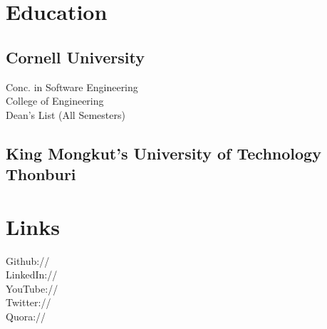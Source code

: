 \documentclass[]{deedy-resume-openfont}
\begin{document}
%
%
\lastupdated

%
%



%
%

\begin{minipage}[t]{0.33\textwidth} 


\section{Education} 

\subsection{Cornell University}
\sectionsep


Conc. in Software Engineering \\
College of Engineering \\
Dean's List (All Semesters) \\
\sectionsep

\subsection{King Mongkut's University of Technology Thonburi}
\sectionsep


\section{Links} 
Github:// \href{https://github.com/deedydas}{} \\
LinkedIn://  \href{https://www.linkedin.com/in/debarghyadas}{} \\
YouTube://  \href{https://www.youtube.com/user/DeedyDash007}{} \\
Twitter://  \href{https://twitter.com/debarghya_das}{} \\
Quora://  \href{https://www.quora.com/Debarghya-Das}{}
\sectionsep


\end{minipage}
\end{document}
